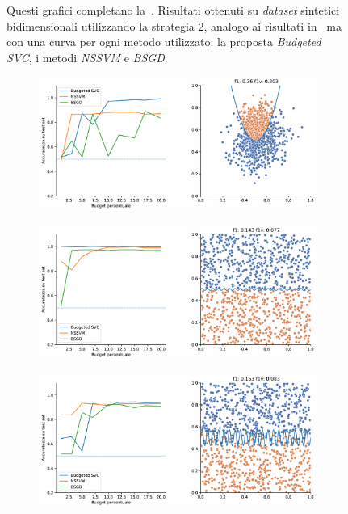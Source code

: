 \begin{appendices}
\begin{figure}[b!]
     \caption[Risultati su \emph{dataset} sintetici utilizzando strategia 2 in confronto ad altri metodi.]{Questi grafici completano la~. Risultati ottenuti su \emph{dataset} sintetici bidimensionali utilizzando la strategia 2, analogo ai risultati in~ ma con una curva per ogni metodo utilizzato: la proposta \emph{Budgeted SVC}, i metodi \emph{NSSVM} e \emph{BSGD}.}
\end{figure}
\begin{figure}[ht]\ContinuedFloat
\centering
    \begin{subfigure}{.8\textwidth}
        \centering
        \includegraphics[width=\textwidth]{img/comp_new/5.pdf}
    \end{subfigure}%
    \hfill
    \begin{subfigure}{.8\textwidth}
        \centering
        \includegraphics[width=\textwidth]{img/comp_new/6.pdf}
    \end{subfigure}%
    \hfill
    \begin{subfigure}{.8\textwidth}
        \centering
        \includegraphics[width=\textwidth]{img/comp_new/9.pdf}

\end{subfigure}
\end{figure}
\end{appendices}
